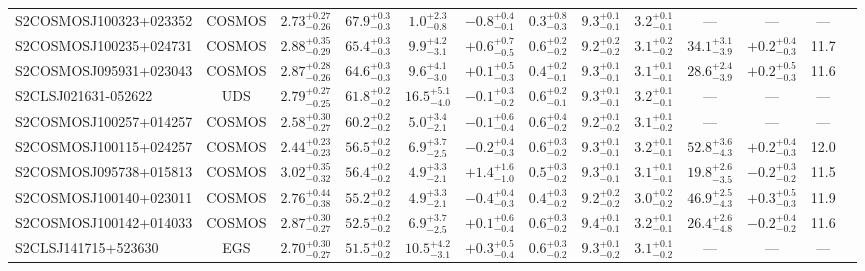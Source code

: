\documentclass[a4paper, fleqn, usenatbib]{mnras}
\begin{document}
\begin{landscape}
\begin{table}
\begin{tabular}{l c c c c c c c c c c c c}
        S2COSMOSJ100323+023352 & COSMOS & $2.73^{+0.27}_{-0.26}$ & $67.9^{+0.3}_{-0.3}$ & $1.0^{+2.3}_{-0.8}$ & $-0.8^{+0.4}_{-0.1}$ & $0.3^{+0.8}_{-0.3}$ & $9.3^{+0.1}_{-0.1}$ & $3.2^{+0.1}_{-0.1}$ & --- & --- & ---\\
        S2COSMOSJ100235+024731 & COSMOS & $2.88^{+0.35}_{-0.29}$ & $65.4^{+0.3}_{-0.3}$ & $9.9^{+4.2}_{-3.1}$ & $+0.6^{+0.7}_{-0.5}$ & $0.6^{+0.2}_{-0.2}$ & $9.2^{+0.2}_{-0.2}$ & $3.1^{+0.2}_{-0.2}$ & $34.1^{+3.1}_{-3.9}$ & $+0.2^{+0.4}_{-0.3}$ & 11.7\\
        S2COSMOSJ095931+023043 & COSMOS & $2.87^{+0.28}_{-0.26}$ & $64.6^{+0.3}_{-0.3}$ & $9.6^{+4.1}_{-3.0}$ & $+0.1^{+0.5}_{-0.3}$ & $0.4^{+0.2}_{-0.1}$ & $9.3^{+0.1}_{-0.1}$ & $3.1^{+0.1}_{-0.1}$ & $28.6^{+2.4}_{-3.9}$ & $+0.2^{+0.5}_{-0.3}$ & 11.6\\
        S2CLSJ021631-052622 & UDS & $2.79^{+0.27}_{-0.25}$ & $61.8^{+0.2}_{-0.2}$ & $16.5^{+5.1}_{-4.0}$ & $-0.1^{+0.3}_{-0.2}$ & $0.6^{+0.2}_{-0.1}$ & $9.3^{+0.1}_{-0.1}$ & $3.2^{+0.1}_{-0.1}$ & --- & --- & ---\\
        S2COSMOSJ100257+014257 & COSMOS & $2.58^{+0.30}_{-0.27}$ & $60.2^{+0.2}_{-0.2}$ & $5.0^{+3.4}_{-2.1}$ & $-0.1^{+0.6}_{-0.4}$ & $0.6^{+0.4}_{-0.2}$ & $9.2^{+0.1}_{-0.2}$ & $3.1^{+0.1}_{-0.2}$ & --- & --- & ---\\
        S2COSMOSJ100115+024257 & COSMOS & $2.44^{+0.23}_{-0.23}$ & $56.5^{+0.2}_{-0.2}$ & $6.9^{+3.7}_{-2.5}$ & $-0.2^{+0.4}_{-0.3}$ & $0.6^{+0.3}_{-0.2}$ & $9.3^{+0.1}_{-0.1}$ & $3.2^{+0.1}_{-0.1}$ & $52.8^{+3.6}_{-4.3}$ & $+0.2^{+0.4}_{-0.3}$ & 12.0\\
        S2COSMOSJ095738+015813 & COSMOS & $3.02^{+0.35}_{-0.32}$ & $56.4^{+0.2}_{-0.2}$ & $4.9^{+3.3}_{-2.1}$ & $+1.4^{+1.6}_{-1.0}$ & $0.5^{+0.3}_{-0.2}$ & $9.3^{+0.1}_{-0.1}$ & $3.1^{+0.1}_{-0.1}$ & $19.8^{+2.6}_{-3.5}$ & $-0.2^{+0.3}_{-0.2}$ & 11.5\\
        S2COSMOSJ100140+023011 & COSMOS & $2.76^{+0.44}_{-0.38}$ & $55.2^{+0.2}_{-0.2}$ & $4.9^{+3.3}_{-2.1}$ & $-0.4^{+0.4}_{-0.3}$ & $0.4^{+0.3}_{-0.2}$ & $9.2^{+0.2}_{-0.2}$ & $3.0^{+0.2}_{-0.2}$ & $46.9^{+2.5}_{-4.3}$ & $+0.3^{+0.5}_{-0.3}$ & 11.9\\
        S2COSMOSJ100142+014033 & COSMOS & $2.87^{+0.30}_{-0.27}$ & $52.5^{+0.2}_{-0.2}$ & $6.9^{+3.7}_{-2.5}$ & $+0.1^{+0.6}_{-0.4}$ & $0.6^{+0.3}_{-0.2}$ & $9.4^{+0.1}_{-0.1}$ & $3.2^{+0.1}_{-0.1}$ & $26.4^{+2.6}_{-4.8}$ & $-0.2^{+0.4}_{-0.2}$ & 11.6\\
        S2CLSJ141715+523630 & EGS & $2.70^{+0.30}_{-0.27}$ & $51.5^{+0.2}_{-0.2}$ & $10.5^{+4.2}_{-3.1}$ & $+0.3^{+0.5}_{-0.4}$ & $0.6^{+0.3}_{-0.2}$ & $9.3^{+0.1}_{-0.2}$ & $3.1^{+0.1}_{-0.2}$ & --- & --- & ---\\

\end{tabular}
\end{table}
\end{landscape}
\end{document}

